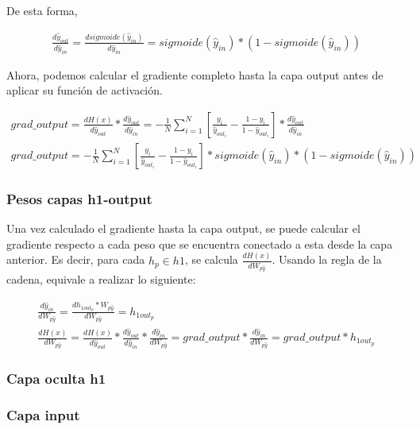 De esta forma,

\begin{gather}
	\frac{d\hat{y}_{out}}{d\hat{y}_{in}} = \frac{d sigmoide(\hat{y}_{in})}{d\hat{y}_{in}} = sigmoide(\hat{y}_{in})*(1-sigmoide(\hat{y}_{in}))
\end{gather}

Ahora, podemos calcular el gradiente completo hasta la capa output antes de aplicar su función de activación.

\begin{gather}
	grad\_output = \frac{dH(x)}{d\hat{y}_{out}} * \frac{d\hat{y}_{out}}{d\hat{y}_{in}} =
	    - \frac{1}{N} \sum_{i=1}^{N}  [ \frac{y_i}{\hat{y}_{out_i}} - \frac{1-y_i}{1-\hat{y}_{out_i}} ] * \frac{d\hat{y}_{out}}{d\hat{y}_{in}} \\
	    grad\_output = - \frac{1}{N} \sum_{i=1}^{N}  [ \frac{y_i}{\hat{y}_{out_i}} - \frac{1-y_i}{1-\hat{y}_{out_i}} ] * sigmoide(\hat{y}_{in})*(1-sigmoide(\hat{y}_{in}))
\end{gather}

\subsubsection{Pesos capas h1-output}

Una vez calculado el gradiente hasta la capa output, se puede calcular el gradiente respecto a cada peso que se encuentra conectado a esta desde la capa anterior. Es decir, para cada $h_p\in h1$, se calcula $\frac{dH(x)}{dW_{p\hat{y}}}$. Usando la regla de la cadena, equivale a realizar lo siguiente:

\begin{gather}
	\frac{d\hat{y}_{in}}{dW_{p\hat{y}}} = \frac{dh_{1out_p} * W_{p\hat{y}}}{dW_{p\hat{y}}} = h_{1out_p} \\
		\frac{dH(x)}{dW_{p\hat{y}}} = \frac{dH(x)}{d\hat{y}_{out}} * \frac{d\hat{y}_{out}}{d\hat{y}_{in}} * \frac{d\hat{y}_{in}}{dW_{p\hat{y}}} =  grad\_output * \frac{d\hat{y}_{in}}{dW_{p\hat{y}}} = grad\_output * h_{1out_p}
\end{gather}

\subsubsection{Capa oculta h1}

\subsubsection{Capa input}